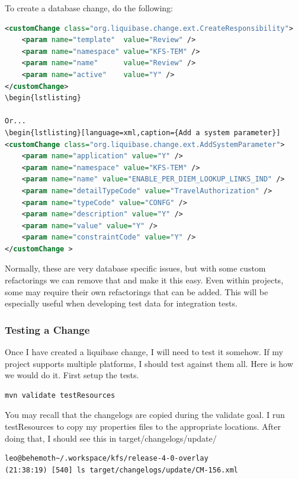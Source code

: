 \documentclass[12pt,notitlepage]{article}
\begin{document}
To create a database change, do the following:
\begin{lstlisting}[language=xml,caption={Create a change in liquibase}]
<customChange class="org.liquibase.change.ext.CreateResponsibility">
    <param name="template"  value="Review" />
    <param name="namespace" value="KFS-TEM" />
    <param name="name"      value="Review" />
    <param name="active"    value="Y" />
</customChange>
\begin{lstlisting}

Or...
\begin{lstlisting}[language=xml,caption={Add a system parameter}]
<customChange class="org.liquibase.change.ext.AddSystemParameter">
    <param name="application" value="Y" />
    <param name="namespace" value="KFS-TEM" />
    <param name="name" value="ENABLE_PER_DIEM_LOOKUP_LINKS_IND" />
    <param name="detailTypeCode" value="TravelAuthorization" />
    <param name="typeCode" value="CONFG" />
    <param name="description" value="Y" />
    <param name="value" value="Y" />
    <param name="constraintCode" value="Y" />
</customChange >
\end{lstlisting}

Normally, these are very database specific issues, but with some
custom refactorings we can remove that and make it this easy. Even
within projects, some may require their own refactorings that can be
added. This will be especially useful when developing test data for
integration tests.


\subsubsection{Testing a Change}

Once I have created a liquibase change, I will need to test it
somehow. If my project supports multiple platforms, I should test
against them all. Here is how we would do it. First setup the tests.

\begin{lstlisting}
mvn validate testResources
\end{lstlisting}

You may recall that the changelogs are copied during the validate
goal. I run testResources to copy my properties files to the
appropriate locations. After doing that, I should see this in
target/changelogs/update/

\begin{lstlisting}
leo@behemoth~/.workspace/kfs/release-4-0-overlay
(21:38:19) [540] ls target/changelogs/update/CM-156.xml
\end{lstlisting}
\end{document}
